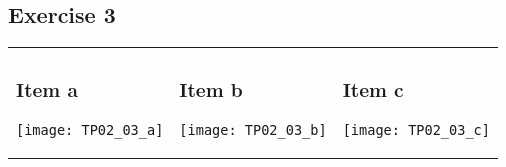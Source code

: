 {\subsection{Exercise 3}
\begin{center} \vspace*{-20pt}
\begin{tabular}{p{48mm} p{48mm} p{48mm}}
	\subsubsection{Item a}
	\begin{center} \texttt{[image: TP02\_03\_a]} \end{center}
	&
	\subsubsection{Item b}
	\begin{center} \texttt{[image: TP02\_03\_b]} \end{center}
	&
	\subsubsection{Item c}
	\begin{center} \texttt{[image: TP02\_03\_c]} \end{center}
\end{tabular}
\end{center}
}

